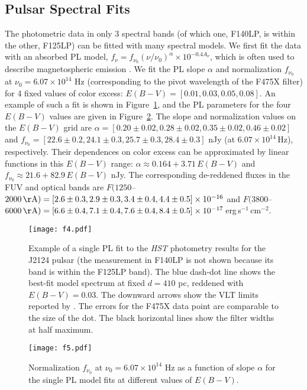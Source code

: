 \documentclass[iop]{emulateapj}
\begin{document}
\subsection{Pulsar Spectral Fits}

The photometric data in only 3 spectral bands (of which one, F140LP, is within the other, F125LP) can be fitted with many spectral models. We first fit the data with an absorbed PL model, $f_\nu=f_{\nu_0}(\nu/\nu_0)^{\alpha}\times10^{-0.4 A_\nu}$, which is often used to describe magnetospheric emission \citep{1997ApJ...489L..75P}. We fit  the PL slope $\alpha$ and normalization $f_{\nu_0}$ at $\nu_0=6.07\times 10^{14}$ Hz (corresponding to the pivot wavelength of the F475X filter) for 4 fixed values of color excess: $E(B-V)=[0.01, 0.03, 0.05, 0.08]$. An example of such a fit is shown in Figure~\ref{pl-only}, and the PL parameters for the four  $E(B-V)$ values are given in  Figure~\ref{alpha-n}. The slope and normalization values on the $E(B-V)$ grid are $\alpha=[0.20\pm0.02, 0.28\pm0.02, 0.35\pm0.02, 0.46\pm0.02]$ and $f_{\nu_0}= [22.6\pm0.2, 24.1\pm0.3, 25.7\pm0.3, 28.4\pm0.3]$ nJy (at $6.07\times10^{14}$\,Hz), respectively. Their dependences on color excess can be approximated by linear functions in this $E(B-V)$ range: $\alpha\approx 0.164 + 3.71\,E(B-V)$ and $f_{\nu_0} \approx 21.6 +82.9\,E(B-V)$ nJy. The corresponding de-reddened fluxes in the FUV and optical bands are $F(1250$--$2000\,{\rm \AA})= [2.6\pm 0.3, 2.9\pm 0.3, 3.4\pm 0.4, 4.4\pm 0.5] \times10^{-16}$ and $F(3800$--$6000\,{\rm \AA}) = [6.6\pm 0.4, 7.1\pm 0.4, 7.6\pm 0.4, 8.4\pm 0.5] \times 10^{-17}$\,erg\,s$^{-1}$\,cm$^{-2}$.  



\begin{figure}
\texttt{[image: f4.pdf]}
\caption{Example of a single PL fit to the {\sl HST} photometry results for the J2124 pulsar (the measurement in F140LP is not shown because its band is within the F125LP band). The blue dash-dot line shows the best-fit model spectrum at fixed $d=410$ pc, reddened with ${E(B-V)}=0.03$. The downward arrows show the VLT limits reported by \citet{2004AdSpR..33..616M}. The errors for the F475X data point are comparable to the size of the dot. The black horizontal lines show the filter widths at half maximum.}
\label{pl-only}
\end{figure}

\begin{figure}
\texttt{[image: f5.pdf]}
\caption{Normalization $f_{\nu_0}$ at $\nu_0=6.07\times 10^{14}$ Hz as a function of slope $\alpha$ for the single PL  model fits at different values of 
$E(B-V)$.}
\label{alpha-n}
\end{figure}
\end{document}
